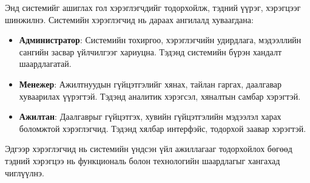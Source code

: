 Энд системийг ашиглах гол хэрэглэгчдийг тодорхойлж, тэдний үүрэг, хэрэгцээг шинжилнэ. Системийн хэрэглэгчид нь дараах ангилалд хуваагдана:
\begin{itemize}
    \item \textbf{Администратор}: Системийн тохиргоо, хэрэглэгчийн удирдлага, мэдээллийн сангийн засвар үйлчилгээг хариуцна. Тэдэнд системийн бүрэн хандалт шаардлагатай.
    \item \textbf{Менежер}: Ажилтнуудын гүйцэтгэлийг хянах, тайлан гаргах, даалгавар хуваарилах үүрэгтэй. Тэдэнд аналитик хэрэгсэл, хяналтын самбар хэрэгтэй.
    \item \textbf{Ажилтан}: Даалгаврыг гүйцэтгэх, хувийн гүйцэтгэлийн мэдээлэл харах боломжтой хэрэглэгчид. Тэдэнд хялбар интерфэйс, тодорхой заавар хэрэгтэй.
\end{itemize}
Эдгээр хэрэглэгчид нь системийн үндсэн үйл ажиллагааг тодорхойлох бөгөөд тэдний хэрэгцээ нь функциональ болон технологийн шаардлагыг хангахад чиглүүлнэ.